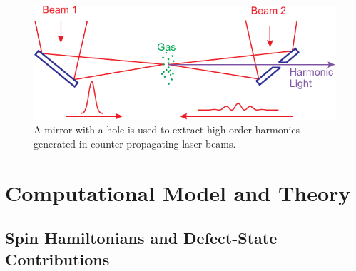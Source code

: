 \documentclass[oneside, astronomy, noacknowlegments]{BYUPhys}
\begin{document}
\section{}
\section{}
\section{}
\section{}

\begin{figure}
    \centerline{\includegraphics{Graphic1}}
    \caption[Magnetic field and microwave frequency relationship]{\label{fig:MFRelationship}
     A mirror with a hole is used to extract high-order harmonics generated in
     counter-propagating laser beams.}
 \end{figure}

\section{}
\section{}

\chapter{Computational Model and Theory}
\section{}
\section{}
\section{Spin Hamiltonians and Defect-State Contributions}
\end{document}
